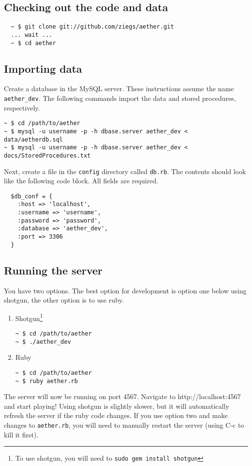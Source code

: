\subsection{Checking out the code and data}
\begin{verbatim}
  ~ $ git clone git://github.com/ziegs/aether.git
  ... wait ...
  ~ $ cd aether
\end{verbatim}
\subsection{Importing data}
Create a database in the MySQL server. These instructions assume the name \verb!aether_dev!. The following commands import the data and stored procedures, respectively.
\begin{verbatim}
~ $ cd /path/to/aether
~ $ mysql -u username -p -h dbase.server aether_dev < data/aetherdb.sql
~ $ mysql -u username -p -h dbase.server aether_dev < docs/StoredProcedures.txt
\end{verbatim}
Next, create a file in the \verb!config! directory called \verb!db.rb!. The contents should look like the following code block. All fields are required.
\begin{verbatim}
  $db_conf = {
    :host => 'localhost',
    :username => 'username',
    :password => 'password',
    :database => 'aether_dev',
    :port => 3306
  }
\end{verbatim}
\subsection{Running the server}
You have two options. The best option for development is option one below using shotgun, the other option is to use ruby.
\begin{enumerate}
  \item Shotgun\footnote{To use shotgun, you will need to {\tt sudo gem install shotgun}}
  \begin{verbatim}
~ $ cd /path/to/aether
~ $ ./aether_dev
  \end{verbatim}
  \item Ruby
  \begin{verbatim}
~ $ cd /path/to/aether
~ $ ruby aether.rb
  \end{verbatim}
\end{enumerate}
The server will now be running on port 4567. Navigate to http://localhost:4567 and start playing! Using shotgun is slightly slower, but it will automatically refresh the server if the ruby code changes. If you use option two and make changes to \verb!aether.rb!, you will need to manually restart the server (using C-c to kill it first).

